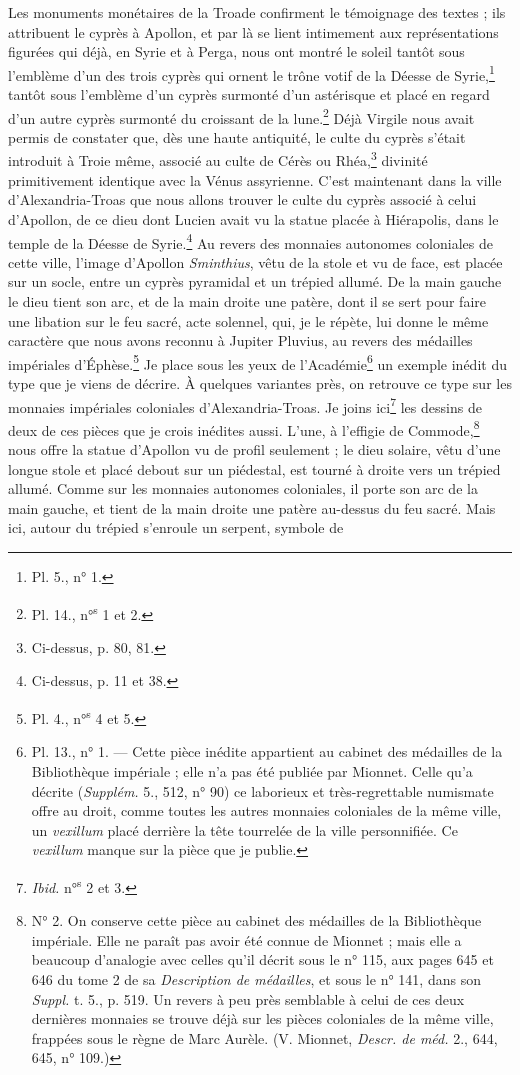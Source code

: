 \documentclass{article}
\begin{document}
Les monuments monétaires de la Troade confirment le témoignage des textes ; ils attribuent le cyprès à Apollon, et par là se lient intimement aux représentations figurées qui déjà, en Syrie et à Perga, nous ont montré le soleil tantôt sous l'emblème d'un des trois cyprès qui ornent le trône votif de la Déesse de Syrie,\footnote{Pl. 5., n° 1.} tantôt sous l'emblème d'un cyprès surmonté d'un astérisque et placé en regard d'un autre cyprès surmonté du croissant de la lune.\footnote{Pl. 14., n°\textsuperscript{s} 1 et 2.} Déjà Virgile nous avait permis de constater que, dès une haute antiquité, le culte du cyprès s'était introduit à Troie même, associé au culte de Cérès ou Rhéa,\footnote{Ci-dessus, p. 80, 81.} divinité primitivement identique avec la Vénus assyrienne. C'est maintenant dans la ville d'Alexandria-Troas que nous allons trouver le culte du cyprès associé à celui d'Apollon, de ce dieu dont Lucien avait vu la statue placée à Hiérapolis, dans le temple de la Déesse de Syrie.\footnote{Ci-dessus, p. 11 et 38.} Au revers des monnaies autonomes coloniales de cette ville, l'image d'Apollon \emph{Sminthius}, vêtu de la stole et vu de face, est placée sur un socle, entre un cyprès pyramidal et un trépied allumé. De la main gauche le dieu tient son arc, et de la main droite une patère, dont il se sert pour faire une libation sur le feu sacré, acte solennel, qui, je le répète, lui donne le même caractère que nous avons reconnu à Jupiter Pluvius, au revers des médailles impériales d'Éphèse.\footnote{Pl. 4., n°\textsuperscript{s} 4 et 5.} Je place sous les yeux de l'Académie\footnote{Pl. 13., n° 1. --- Cette pièce inédite appartient au cabinet des médailles de la Bibliothèque impériale ; elle n'a pas été publiée par Mionnet. Celle qu'a décrite (\emph{Supplém.} 5., 512, n° 90) ce laborieux et très-regrettable numismate offre au droit, comme toutes les autres monnaies coloniales de la même ville, un \emph{vexillum} placé derrière la tête tourrelée de la ville personnifiée. Ce \emph{vexillum} manque sur la pièce que je publie.} un exemple inédit du type que je viens de décrire. À quelques variantes près, on retrouve ce type sur les monnaies impériales coloniales d'Alexandria-Troas. Je joins ici\footnote{\emph{Ibid.} n°\textsuperscript{s} 2 et 3.} les dessins de deux de ces pièces que je crois inédites aussi. L'une, à l'effigie de Commode,\footnote{N° 2. On conserve cette pièce au cabinet des médailles de la Bibliothèque impériale. Elle ne paraît pas avoir été connue de Mionnet ; mais elle a beaucoup d'analogie avec celles qu'il décrit sous le n° 115, aux pages 645 et 646 du tome 2 de sa \emph{Description de médailles}, et sous le n° 141, dans son \emph{Suppl.} t. 5., p. 519. Un revers à peu près semblable à celui de ces deux dernières monnaies se trouve déjà sur les pièces coloniales de la même ville, frappées sous le règne de Marc Aurèle. (V. Mionnet, \emph{Descr. de méd.} 2., 644, 645, n° 109.)} nous offre la statue d'Apollon vu de profil seulement ; le dieu solaire, vêtu d'une longue stole et placé debout sur un piédestal, est tourné à droite vers un trépied allumé. Comme sur les monnaies autonomes coloniales, il porte son arc de la main gauche, et tient de la main droite une patère au-dessus du feu sacré. Mais ici, autour du trépied s'enroule un serpent, symbole de 
\end{document}
